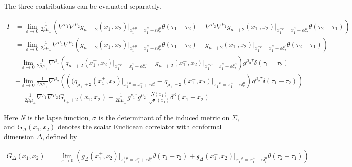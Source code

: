 The three contributions can be evaluated separately.

\begin{align}
I & =\lim_{ \varepsilon \to 0 }  \frac{1}{2\bar{\mu}\mu _{+}}\left(\nabla ^{\mu_{1}}\nabla ^{\mu_{2}}g_{\mu _{+}+2}(x_{1}^{+},x_{2})\bigg|_{x_{1}^{+\mu}=x_{1}^{\mu}+\varepsilon \delta _{\tau}^{\mu}}\theta(\tau_{1}-\tau_{2})+\nabla ^{\mu_{2}}\nabla ^{\mu_{1}}g_{\mu _{+}+2}(x_{1}^{-},x_{2})\bigg|_{x_{1}^{-\mu}=x_{1}^{\mu}-\varepsilon \delta _{\tau}^{\mu}}\theta(\tau_{2}-\tau_{1})\right) \\
 & =\lim_{ \varepsilon \to 0 } \frac{1}{2\bar{\mu}\mu _{+}}\nabla ^{\mu_{1}}\nabla ^{\mu_{2}}\left(g_{\mu _{+}+2}(x_{1}^{+},x_{2})\bigg|_{x_{1}^{+\mu}=x_{1}^{\mu}+\varepsilon \delta _{\tau}^{\mu}}\theta(\tau_{1}-\tau_{2})+g_{\mu _{+}+2}(x_{1}^{-},x_{2})\bigg|_{x_{1}^{-\mu}=x_{1}^{\mu}-\varepsilon \delta _{\tau}^{\mu}}\theta(\tau_{2}-\tau_{1})\right) \\
 & -\lim_{ \varepsilon \to 0 } \frac{1}{2\bar{\mu}\mu _{+}}\nabla ^{\mu_{1}}(g_{\mu _{+}+2}(x_{1}^{+},x_{2})\bigg|_{x_{1}^{+\mu}=x_{1}^{\mu}+\varepsilon \delta ^{\mu}_{\tau}}-g_{\mu _{+}+2}(x_{1}^{-},x_{2})\bigg|_{x_{1}^{-\mu}=x_{1}^{\mu}-\varepsilon \delta ^{\mu}_{\tau}})g^{\mu_{2}\tau}\delta(\tau_{1}-\tau_{2}) \\
 & -\lim_{ \varepsilon \to 0 } \frac{1}{2\bar{\mu}\mu _{+}}\nabla ^{\mu_{2}}\left(\left((g_{\mu _{+}+2}(x_{1}^{+},x_{2})\bigg|_{x_{1}^{+\mu}=x_{1}^{\mu}+\varepsilon \delta ^{\mu}_{\tau}}-g_{\mu _{+}+2}(x_{1}^{-},x_{2})\bigg|_{x_{1}^{-\mu}=x_{1}^{\mu}-\varepsilon \delta _{\tau}^{\mu}}\right)g^{\mu_{2}\tau}\delta(\tau_{1}-\tau_{2})\right) \\
 & =\frac{1}{2\bar{\mu}\mu _{+}}\nabla ^{\mu_{1}}\nabla ^{\mu_{2}}G_{\mu _{+}+2}(x_{1},x_{2})-\frac{1}{2\bar{\mu}\mu _{+}}g^{\mu_{1}\tau}g^{\mu_{2}\tau} \frac{N(x_{1})}{\sqrt{ \sigma }(x_{1})}\delta ^{3}(x_{1}-x_{2})
\end{align}

Here $N$ is the lapse function, $\sigma$ is the determinant of the induced metric on $\Sigma$, and $G_{\Delta}(x_{1},x_{2})$ denotes the scalar Euclidean correlator with conformal dimension $\Delta$, defined by

\begin{align}
G_{\Delta}(x_{1},x_{2}) & =\lim_{ \varepsilon \to 0 } \left(g_{\Delta}(x_{1}^{+},x_{2})\bigg|_{x_{1}^{+\mu}=x_{1}^{\mu}+\varepsilon \delta _{\tau}^{\mu}}\theta(\tau_{1}-\tau_{2})+g_{\Delta}(x_{1}^{-},x_{2})\bigg|_{x_{1}^{-\mu}=x_{1}^{\mu}-\varepsilon \delta _{\tau}^{\mu}}\theta(\tau_{2}-\tau_{1})\right)
\end{align}

